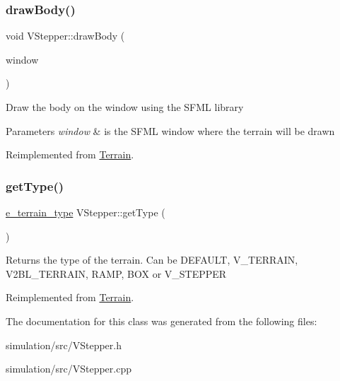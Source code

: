 \subsubsection{\texorpdfstring{draw\+Body()}{drawBody()}}
{\footnotesize\ttfamily void V\+Stepper\+::draw\+Body (\begin{DoxyParamCaption}\item[{sf\+::\+Render\+Window \&}]{window }\end{DoxyParamCaption})\hspace{0.3cm}{\ttfamily [virtual]}}

Draw the body on the window using the S\+F\+ML library 
\begin{DoxyParams}{Parameters}
{\em window} & is the S\+F\+ML window where the terrain will be drawn \\
\hline
\end{DoxyParams}


Reimplemented from \mbox{\hyperlink{class_terrain_ae60571b91c1979fa94bdfc5002da6ac7}{Terrain}}.

\mbox{\label{class_v_stepper_a9621c3cbd705479e32baf9671983cb8b}} 
\subsubsection{\texorpdfstring{get\+Type()}{getType()}}
{\footnotesize\ttfamily \mbox{\hyperlink{_terrain_8h_a6d0b7e83bb7325270c1162bece970fd8}{e\+\_\+terrain\+\_\+type}} V\+Stepper\+::get\+Type (\begin{DoxyParamCaption}{ }\end{DoxyParamCaption})\hspace{0.3cm}{\ttfamily [virtual]}}

\begin{DoxyReturn}{Returns}
the type of the terrain. Can be D\+E\+F\+A\+U\+LT, V\+\_\+\+T\+E\+R\+R\+A\+IN, V2\+B\+L\+\_\+\+T\+E\+R\+R\+A\+IN, R\+A\+MP, B\+OX or V\+\_\+\+S\+T\+E\+P\+P\+ER 
\end{DoxyReturn}


Reimplemented from \mbox{\hyperlink{class_terrain_a6cd1220b8e64466cc7a2219efff4141b}{Terrain}}.



The documentation for this class was generated from the following files\+:\begin{DoxyCompactItemize}
\item 
simulation/src/V\+Stepper.\+h\item 
simulation/src/V\+Stepper.\+cpp\end{DoxyCompactItemize}
